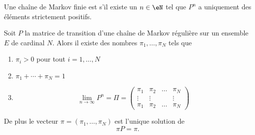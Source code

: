 \begin{definition}
    Une chaîne de Markov finie est  s'il existe un \( n\in \eN\) tel que \( P^n\) a uniquement des éléments strictement positifs.
\end{definition}

\begin{theorem}
    Soit \( P\) la matrice de transition d'une chaîne de Markov régulière sur un ensemble \( E\) de cardinal \( N\). Alors il existe des nombres \( \pi_1,\ldots, \pi_N\) tels que
    \begin{enumerate}
        \item
            \( \pi_i>0\) pour tout \( i=1,\ldots, N\)
        \item
            \( \pi_1+\cdots +\pi_N=1\)
        \item
            \begin{equation}
                \lim_{n\to \infty} P^n=\Pi=\begin{pmatrix}
                     \pi_1   &   \pi_2    &   \ldots    &   \pi_N    \\
                     \vdots   &   \vdots    &       &   \vdots    \\ 
                     \pi_1   &   \pi_2    &   \ldots    &   \pi_N
                 \end{pmatrix}
            \end{equation}
    \end{enumerate}
    De plus le vecteur \( \pi=(\pi_1,\ldots, \pi_N)\) est l'unique solution de 
    \begin{equation}
        \pi P=\pi.
    \end{equation}
\end{theorem}

